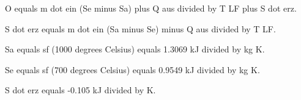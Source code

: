 O equals m dot ein (Se minus Sa) plus Q aus divided by T LF plus S dot erz.

S dot erz equals m dot ein (Sa minus Se) minus Q aus divided by T LF.

Sa equals sf (1000 degrees Celsius) equals 1.3069 kJ divided by kg K.

Se equals sf (700 degrees Celsius) equals 0.9549 kJ divided by kg K.

S dot erz equals -0.105 kJ divided by K.